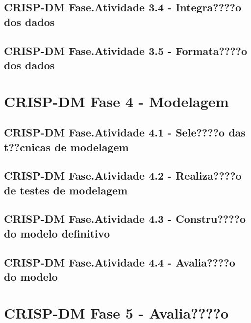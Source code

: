 \documentclass[]{article}
\begin{document}
\subsection{CRISP-DM Fase.Atividade 3.4 - Integra????o dos
dados}\label{crisp-dm-fase.atividade-3.4---integrao-dos-dados}

\subsection{CRISP-DM Fase.Atividade 3.5 - Formata????o dos
dados}\label{crisp-dm-fase.atividade-3.5---formatao-dos-dados}

\section{\texorpdfstring{CRISP-DM Fase 4 -
\textbf{Modelagem}}{CRISP-DM Fase 4 - Modelagem}}\label{crisp-dm-fase-4---modelagem}

\subsection{CRISP-DM Fase.Atividade 4.1 - Sele????o das t??cnicas de
modelagem}\label{crisp-dm-fase.atividade-4.1---seleo-das-tcnicas-de-modelagem}

\subsection{CRISP-DM Fase.Atividade 4.2 - Realiza????o de testes de
modelagem}\label{crisp-dm-fase.atividade-4.2---realizao-de-testes-de-modelagem}

\subsection{CRISP-DM Fase.Atividade 4.3 - Constru????o do modelo
definitivo}\label{crisp-dm-fase.atividade-4.3---construo-do-modelo-definitivo}

\subsection{CRISP-DM Fase.Atividade 4.4 - Avalia????o do
modelo}\label{crisp-dm-fase.atividade-4.4---avaliao-do-modelo}

\section{\texorpdfstring{CRISP-DM Fase 5 -
\textbf{Avalia????o}}{CRISP-DM Fase 5 - Avalia????o}}\label{crisp-dm-fase-5---avaliao}
\end{document}
